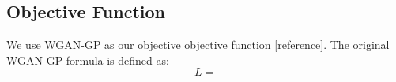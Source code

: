 \subsection{Objective Function}
We use WGAN-GP as our objective objective function [reference]. The original WGAN-GP formula is defined as:
\begin{equation}
\label{eqn:WGAN-GP}
L = 
\end{equation}